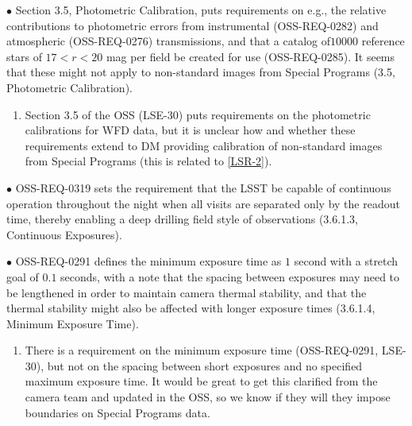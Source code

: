 \documentclass[DM,lsstdraft,toc]{lsstdoc}
\begin{document}
$\bullet$ Section 3.5, Photometric Calibration, puts requirements on e.g., the relative contributions to photometric errors from instrumental (OSS-REQ-0282) and atmospheric (OSS-REQ-0276) transmissions, and that a catalog of$10000$ reference stars of $17<r<20$ mag per field be created for use (OSS-REQ-0285). It seems that these might not apply to non-standard images from Special Programs (3.5, Photometric Calibration).
\begin{enumerate}[topsep=-10pt,after=\vspace{10pt},label= \textbf{Concern \Roman*.},resume] \item \label{OSS-4} Section 3.5 of the OSS (LSE-30) puts requirements on the photometric calibrations for WFD data, but it is unclear how and whether these requirements extend to DM providing calibration of non-standard images from Special Programs (this is related to \ref{LSR-2}). \end{enumerate}

$\bullet$ OSS-REQ-0319 sets the requirement that the LSST be capable of continuous operation throughout the night when all visits are separated only by the readout time, thereby enabling a deep drilling field style of observations (3.6.1.3, Continuous Exposures).

$\bullet$ OSS-REQ-0291 defines the minimum exposure time as $1$ second with a stretch goal of $0.1$ seconds, with a note that the spacing between exposures may need to be lengthened in order to maintain camera thermal stability, and that the thermal stability might also be affected with longer exposure times (3.6.1.4, Minimum Exposure Time). \\
\begin{enumerate}[topsep=-10pt,after=\vspace{10pt},label= \textbf{Concern \Roman*.},resume] \item \label{OSS-5} There is a requirement on the minimum exposure time (OSS-REQ-0291, LSE-30), but not on the spacing between short exposures and no specified maximum exposure time. It would be great to get this clarified from the camera team and updated in the OSS, so we know if they will they impose boundaries on Special Programs data. \end{enumerate}
\end{document}
